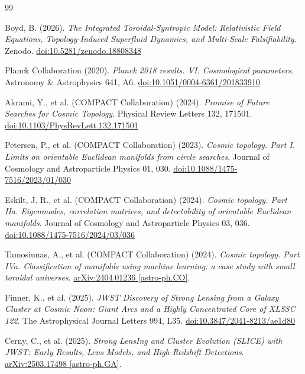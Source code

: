 \documentclass[aps,prd,11pt,onecolumn,superscriptaddress,nofootinbib,floatfix]{revtex4-2}
\begin{document}
\begin{thebibliography}{99}

Boyd, B. (2026). \textit{The Integrated Toroidal-Syntropic Model: Relativistic Field Equations, Topology-Induced Superfluid Dynamics, and Multi-Scale Falsifiability}. Zenodo. \href{https://doi.org/10.5281/zenodo.18808348}{doi:10.5281/zenodo.18808348}

Planck Collaboration (2020). \textit{Planck 2018 results. VI. Cosmological parameters}. Astronomy \& Astrophysics 641, A6. \href{https://doi.org/10.1051/0004-6361/201833910}{doi:10.1051/0004-6361/201833910}

Akrami, Y., et al. (COMPACT Collaboration) (2024). \textit{Promise of Future Searches for Cosmic Topology}. Physical Review Letters 132, 171501. \href{https://doi.org/10.1103/PhysRevLett.132.171501}{doi:10.1103/PhysRevLett.132.171501}

Petersen, P., et al. (COMPACT Collaboration) (2023). \textit{Cosmic topology. Part I. Limits on orientable Euclidean manifolds from circle searches}. Journal of Cosmology and Astroparticle Physics 01, 030. \href{https://doi.org/10.1088/1475-7516/2023/01/030}{doi:10.1088/1475-7516/2023/01/030}

Eskilt, J. R., et al. (COMPACT Collaboration) (2024). \textit{Cosmic topology. Part IIa. Eigenmodes, correlation matrices, and detectability of orientable Euclidean manifolds}. Journal of Cosmology and Astroparticle Physics 03, 036. \href{https://doi.org/10.1088/1475-7516/2024/03/036}{doi:10.1088/1475-7516/2024/03/036}

Tamosiunas, A., et al. (COMPACT Collaboration) (2024). \textit{Cosmic topology. Part IVa. Classification of manifolds using machine learning: a case study with small toroidal universes}. \href{https://arxiv.org/abs/2404.01236}{arXiv:2404.01236 [astro-ph.CO]}.

Finner, K., et al. (2025). \textit{JWST Discovery of Strong Lensing from a Galaxy Cluster at Cosmic Noon: Giant Arcs and a Highly Concentrated Core of XLSSC 122}. The Astrophysical Journal Letters 994, L35. \href{https://doi.org/10.3847/2041-8213/ae1d80}{doi:10.3847/2041-8213/ae1d80}

Cerny, C., et al. (2025). \textit{Strong LensIng and Cluster Evolution (SLICE) with JWST: Early Results, Lens Models, and High-Redshift Detections}. \href{https://arxiv.org/abs/2503.17498}{arXiv:2503.17498 [astro-ph.GA]}.


\end{thebibliography}
\end{document}

